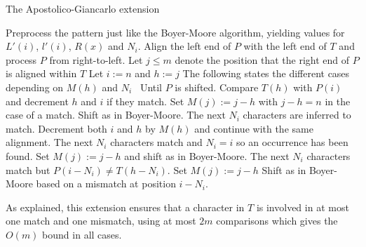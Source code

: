 \begin{algorithm}[ht!]
\caption{The Apostolico-Giancarlo extension}\label{alg:apostolicogiancarlo}
\begin{algorithmic}
\State Preprocess the pattern just like the Boyer-Moore algorithm, yielding values for $L'(i)$, $l'(i)$, $R(x)$ and $N_i$. 
\State Align the left end of $P$ with the left end of $T$ and process $P$ from right-to-left. 
\State Let $j\leq m$ denote the position that the right end of $P$ is aligned within $T$
    \State Let $i:=n$ and $h:=j$
    \State The following states the different cases depending on $M(h)$ and $N_i$
    \Loop\ Until $P$ is shifted. 
        \State Compare $T(h)$ with $P(i)$ and decrement $h$ and $i$ if they match. 
        \State Set $M(j):=j-h$ with $j-h=n$ in the case of a match. 
        \State Shift as in Boyer-Moore. 
        \EndIf
        \State The next $N_i$ characters are inferred to match. 
        \State Decrement both $i$ and $h$ by $M(h)$ and continue with the same alignment. 
        \State The next $N_i$ characters match and $N_i=i$ so an occurrence has been found. 
        \State Set $M(j):=j-h$ and shift as in Boyer-Moore. 
        \State The next $N_i$ characters match but $P(i-N_i)\neq T(h-N_i)$. 
        \State Set $M(j):=j-h$ 
        \State Shift as in Boyer-Moore based on a mismatch at position $i-N_i$. 
    \EndIf
    \EndLoop
\EndFor
\end{algorithmic}
\end{algorithm}

As explained, this extension ensures that a character in $T$ is involved in at most one match and one mismatch, using at most $2m$ comparisons which gives the $O(m)$ bound in all cases. 


